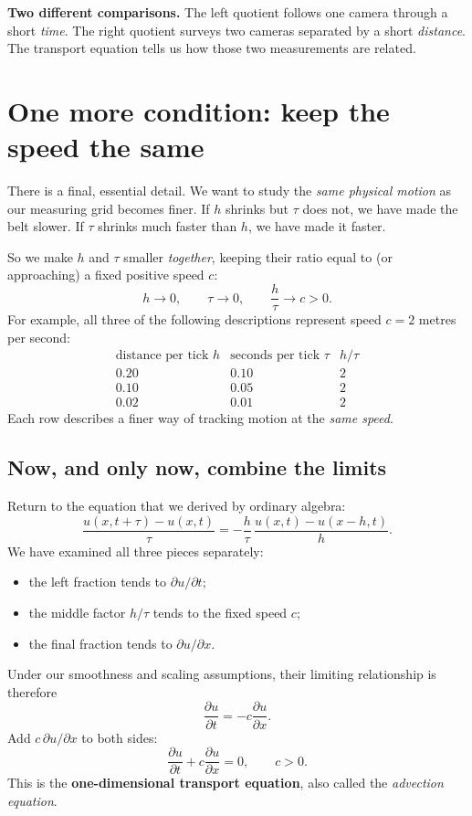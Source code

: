 \documentclass[11pt,a4paper]{article}
\newcommand{\secstart}[1]{\Needspace{7\baselineskip}\section{#1}}
\newcommand{\substart}[1]{\Needspace{5\baselineskip}\subsection{#1}}
\begin{document}
\begin{pointbox}
\textbf{Two different comparisons.} The left quotient follows one camera through a short \emph{time}. The right quotient surveys two cameras separated by a short \emph{distance}. The transport equation tells us how those two measurements are related.
\end{pointbox}

\clearpage
\secstart{One more condition: keep the speed the same}
There is a final, essential detail. We want to study the \emph{same physical motion} as our measuring grid becomes finer. If $h$ shrinks but $\tau$ does not, we have made the belt slower. If $\tau$ shrinks much faster than $h$, we have made it faster.

So we make $h$ and $\tau$ smaller \emph{together}, keeping their ratio equal to (or approaching) a fixed positive speed $c$:
\begin{equation}
\boxed{h\longrightarrow0,\qquad \tau\longrightarrow0,
\qquad\frac{h}{\tau}\longrightarrow c>0.}\tag{8}
\end{equation}
For example, all three of the following descriptions represent speed $c=2$ metres per second:
\[
\begin{array}{c|c|c}
\text{distance per tick }h & \text{seconds per tick }\tau & h/\tau\\\hline
0.20 & 0.10 & 2\\
0.10 & 0.05 & 2\\
0.02 & 0.01 & 2
\end{array}
\]
Each row describes a finer way of tracking motion at the \emph{same speed}.

\substart{Now, and only now, combine the limits}
Return to the equation that we derived by ordinary algebra:
\[
\frac{u(x,t+\tau)-u(x,t)}{\tau}
=-\frac{h}{\tau}\,\frac{u(x,t)-u(x-h,t)}{h}.
\]
We have examined all three pieces separately:
\begin{itemize}
\item the left fraction tends to $\partial u/\partial t$;
\item the middle factor $h/\tau$ tends to the fixed speed $c$;
\item the final fraction tends to $\partial u/\partial x$.
\end{itemize}
Under our smoothness and scaling assumptions, their limiting relationship is therefore
\begin{equation*}
\frac{\partial u}{\partial t}=-c\frac{\partial u}{\partial x}.
\end{equation*}
Add $c\,\partial u/\partial x$ to both sides:
\begin{equation}
\boxed{\displaystyle\frac{\partial u}{\partial t}
+c\frac{\partial u}{\partial x}=0,\qquad c>0.}\tag{9}
\end{equation}
This is the \textbf{one-dimensional transport equation}, also called the \emph{advection equation}.
\end{document}
